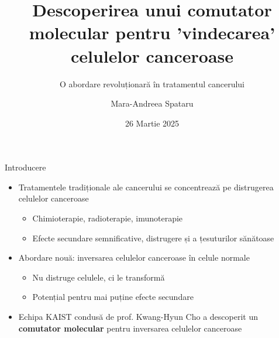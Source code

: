 \documentclass{beamer}
\title{Descoperirea unui comutator molecular pentru 'vindecarea' celulelor canceroase}
\subtitle{O abordare revoluționară în tratamentul cancerului}
\author{Mara-Andreea Spataru}
\institute{Universitatea din București}
\date{26 Martie 2025}
\begin{document}
	
	\begin{frame}
		\titlepage
	\end{frame}
	
	\begin{frame}{Introducere}
		\begin{itemize}
			\item Tratamentele tradiționale ale cancerului se concentrează pe distrugerea celulelor canceroase
			\begin{itemize}
				\item Chimioterapie, radioterapie, imunoterapie
				\item Efecte secundare semnificative, distrugere și a țesuturilor sănătoase
			\end{itemize}
			\item Abordare nouă: inversarea celulelor canceroase în celule normale
			\begin{itemize}
				\item Nu distruge celulele, ci le transformă
				\item Potențial pentru mai puține efecte secundare
			\end{itemize}
			\item Echipa KAIST condusă de prof. Kwang-Hyun Cho a descoperit un \textbf{comutator molecular} pentru inversarea celulelor canceroase
		\end{itemize}
	\end{frame}
	
\end{document}
